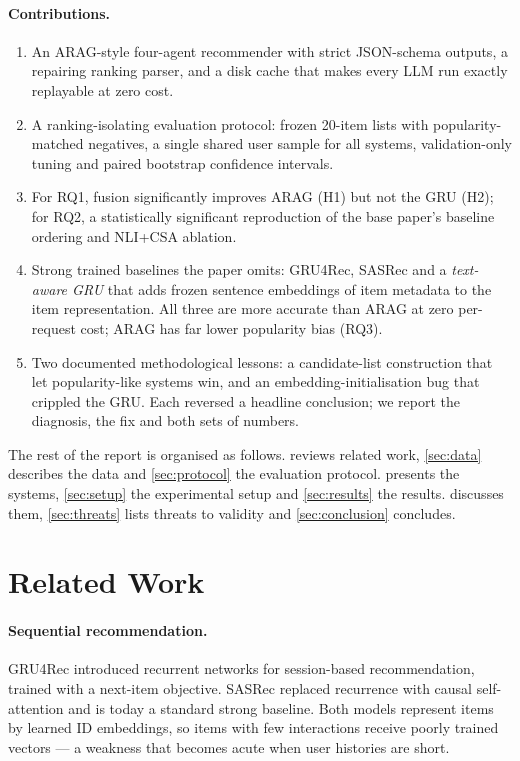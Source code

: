 \documentclass[11pt,a4paper]{article}
\begin{document}
\paragraph{Contributions.}
\begin{enumerate}
  \item An ARAG-style four-agent recommender with strict JSON-schema outputs, a repairing
  ranking parser, and a disk cache that makes every LLM run exactly replayable at zero cost.
  \item A ranking-isolating evaluation protocol: frozen 20-item lists with popularity-matched
  negatives, a single shared user sample for all systems, validation-only tuning and paired
  bootstrap confidence intervals.
  \item For RQ1, fusion significantly improves ARAG (H1) but not the GRU (H2); for RQ2, a
  statistically significant reproduction of the base paper's baseline ordering and NLI+CSA
  ablation.
  \item Strong trained baselines the paper omits: GRU4Rec, SASRec and a \emph{text-aware GRU} that
  adds frozen sentence embeddings of item metadata to the item representation. All three are more
  accurate than ARAG at zero per-request cost; ARAG has far lower popularity bias (RQ3).
  \item Two documented methodological lessons: a candidate-list construction that let
  popularity-like systems win, and an embedding-initialisation bug that crippled the GRU. Each
  reversed a headline conclusion; we report the diagnosis, the fix and both sets of numbers.
\end{enumerate}

The rest of the report is organised as follows.  reviews related work,
\cref{sec:data} describes the data and \cref{sec:protocol} the evaluation protocol.
 presents the systems, \cref{sec:setup} the experimental setup and
\cref{sec:results} the results.  discusses them,
\cref{sec:threats} lists threats to validity and \cref{sec:conclusion} concludes.

\section{Related Work}
\label{sec:related}

\paragraph{Sequential recommendation.} GRU4Rec \citep{hidasi2016session} introduced recurrent
networks \citep{cho2014learning} for session-based recommendation, trained with a next-item
objective. SASRec \citep{kang2018self} replaced recurrence with causal self-attention and is
today a standard strong baseline. Both models represent items by learned ID embeddings, so items
with few interactions receive poorly trained vectors --- a weakness that becomes acute when user
histories are short.
\end{document}
